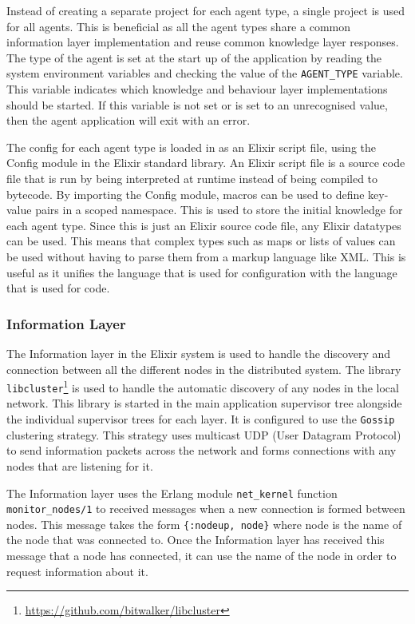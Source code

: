 Instead of creating a separate project for each agent type, a single project is used for all agents.
This is beneficial as all the agent types share a common information layer implementation and reuse common knowledge layer responses.
The type of the agent is set at the start up of the application by reading the system environment variables and checking the value of the \verb|AGENT_TYPE| variable.
This variable indicates which knowledge and behaviour layer implementations should be started.
If this variable is not set or is set to an unrecognised value, then the agent application will exit with an error.

The config for each agent type is loaded in as an Elixir script file, using the Config module in the Elixir standard library.
An Elixir script file is a source code file that is run by being interpreted at runtime instead of being compiled to bytecode.
By importing the Config module, macros can be used to define key-value pairs in a scoped namespace.
This is used to store the initial knowledge for each agent type.
Since this is just an Elixir source code file, any Elixir datatypes can be used.
This means that complex types such as maps or lists of values can be used without having to parse them from a markup language like XML\@.
This is useful as it unifies the language that is used for configuration with the language that is used for code.

\subsubsection{Information Layer}

The Information layer in the Elixir system is used to handle the discovery and connection between all the different nodes in the distributed system.
The library \verb|libcluster|\footnote{\url{https://github.com/bitwalker/libcluster}} is used to handle the automatic discovery of any nodes in the local network.
This library is started in the main application supervisor tree alongside the individual supervisor trees for each layer.
It is configured to use the \verb|Gossip| clustering strategy.
This strategy uses multicast UDP (User Datagram Protocol) to send information packets across the network and forms connections with any nodes that are listening for it.

The Information layer uses the Erlang module \verb|net_kernel| function\\ \verb|monitor_nodes/1| to received messages when a new connection is formed between nodes.
This message takes the form \verb|{:nodeup, node}| where node is the name of the node that was connected to.
Once the Information layer has received this message that a node has connected, it can use the name of the node in order to request information about it.

